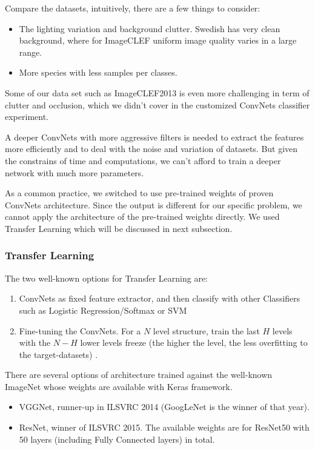 \documentclass[journal, 10pt]{IEEEtran}
\begin{document}
  Compare the datasets, intuitively, there are a few things to consider:
  \begin{itemize}
    \item The lighting variation and background clutter. Swedish has very clean background, where for ImageCLEF uniform image quality varies in a large range.
    \item More species with less samples per classes.
  \end{itemize}

  Some of our data set such as ImageCLEF2013 is even more challenging in term of clutter and occlusion, which we didn't cover in the customized ConvNets classifier experiment.

  A deeper ConvNets with more aggressive filters is needed to extract the features more efficiently and to deal with the noise and variation of datasets. But given the constrains of time and computations, we can't afford to train a deeper network with much more parameters.

  As a common practice, we switched to use pre-trained weights of proven ConvNets architecture. Since the output is different for our specific problem, we cannot apply the architecture of the pre-trained weights directly. We used Transfer Learning which will be discussed in next subsection.

  \subsubsection{Transfer Learning}
  The two well-known options for Transfer Learning are:
  \begin{enumerate}
    \item ConvNets as fixed feature extractor, and then classify with other Classifiers such as Logistic Regression/Softmax or SVM
    \item Fine-tuning the ConvNets. For a $N$ level structure, train the last $H$ levels with the $N-H$ lower levels freeze (the higher the level, the less overfitting to the target-datasets) \cite{CS231N}.
  \end{enumerate}

  There are several options of architecture trained against the well-known ImageNet whose weights are available with Keras framework.
  \begin{itemize}
    \item VGGNet, runner-up in ILSVRC 2014 (GoogLeNet is the winner of that year).
    \item ResNet, winner of ILSVRC 2015. The available weights are for ResNet50 with 50 layers (including Fully Connected layers) in total.
  \end{itemize}
\end{document}
